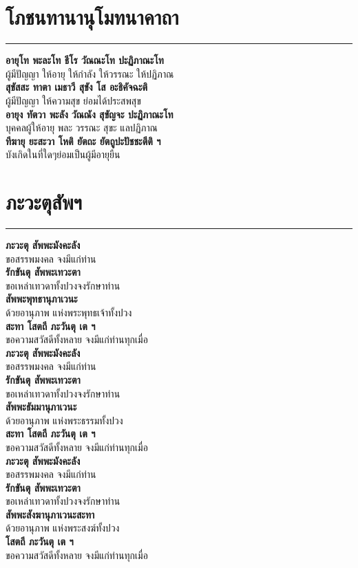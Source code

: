 \documentclass[12pt]{article}
\begin{document}
\section{โภชนทานานุโมทนาคาถา}
\hrule
\textbf{อายุโท พะละโท ธีโร วัณณะโท ปะฏิภาณะโท}\\
\indent ผู้มีปัญญา ให้อายุ ให้กำลัง ให้วรรณะ ให้ปฏิภาณ\\
\textbf{สุขัสสะ ทาตา เมธาวี สุขัง โส อะธิคัจฉะติ}\\
\indent ผู้มีปัญญา ให้ความสุข ย่อมได้ประสพสุข\\
\textbf{อายุง ทัตวา พะลัง วัณณัง สุขัญจะ ปะฏิภาณะโท}\\
\indent บุคคลผู้ให้อายุ พละ วรรณะ สุขะ แลปฏิภาณ\\
\textbf{ทีฆายุ ยะสะวา โหติ ยัตถะ ยัตถูปะปัชชะตีติ ฯ}\\
\indent บังเกิดในที่ใดๆย่อมเป็นผู้มีอายุยืน\\


\pagebreak
\section{ภะวะตุสัพฯ}
\hrule
\textbf{ภะวะตุ สัพพะมังคะลัง}\\
\indent ขอสรรพมงคล จงมีแก่ท่าน\\
\textbf{รักขันตุ สัพพะเทวะตา}\\
\indent ขอเหล่าเทวดาทั้งปวงจงรักษาท่าน\\
\textbf{สัพพะพุทธานุภาเวนะ}\\
\indent ด้วยอานุภาพ แห่งพระพุทธเจ้าทั้งปวง\\
\textbf{สะทา โสตถี ภะวันตุ เต ฯ}\\
\indent ขอความสวัสดีทั้งหลาย จงมีแก่ท่านทุกเมื่อ\\
\textbf{ภะวะตุ สัพพะมังคะลัง}\\
\indent ขอสรรพมงคล จงมีแก่ท่าน\\
\textbf{รักขันตุ สัพพะเทวะตา}\\
\indent ขอเหล่าเทวดาทั้งปวงจงรักษาท่าน\\
\textbf{สัพพะธัมมานุภาเวนะ}\\
\indent ด้วยอานุภาพ แห่งพระธรรมทั้งปวง\\
\textbf{สะทา โสตถี ภะวันตุ เต ฯ}\\
\indent ขอความสวัสดีทั้งหลาย จงมีแก่ท่านทุกเมื่อ\\
\textbf{ภะวะตุ สัพพะมังคะลัง}\\
\indent ขอสรรพมงคล จงมีแก่ท่าน\\
\textbf{รักขันตุ สัพพะเทวะตา}\\
\indent ขอเหล่าเทวดาทั้งปวงจงรักษาท่าน\\
\textbf{สัพพะสังฆานุภาเวนะสะทา}\\
\indent ด้วยอานุภาพ แห่งพระสงฆ์ทั้งปวง\\
\textbf{โสตถี ภะวันตุ เต ฯ}\\
\indent ขอความสวัสดีทั้งหลาย จงมีแก่ท่านทุกเมื่อ

\pagebreak
\vspace*{\fill}
\begin{center}
\end{center}
\vspace{\fill}
\pagebreak
\end{document}

